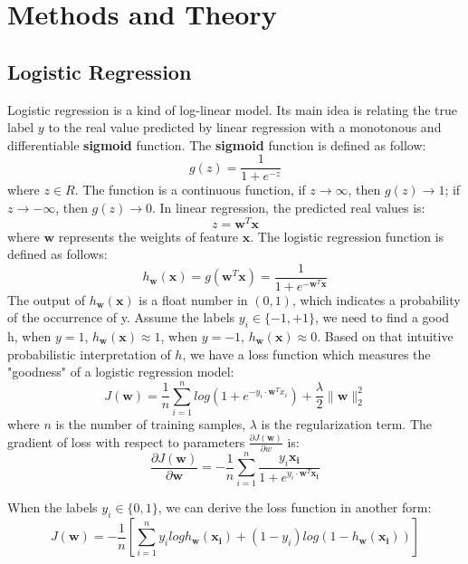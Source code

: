 \documentclass[journal, a4paper]{IEEEtran}
\begin{document}
\section{Methods and Theory}

\subsection{Logistic Regression}
Logistic regression is a kind of log-linear model. Its main idea is relating the true label $y$ to the real value predicted by linear regression with a monotonous and differentiable \textbf{sigmoid} function. The \textbf{sigmoid} function is defined as follow:
\begin{equation}
g(z) = \frac{1}{1+e^{-z}}
\end{equation}
where $z \in R$. The function is a continuous function, if $z \rightarrow \infty$, then $g(z) \rightarrow 1$; if $z \rightarrow -\infty$, then $g(z) \rightarrow 0$. In linear regression, the predicted real values is:
\begin{equation}
z = \bm{w}^{T}\bm{x}
\end{equation}
where $\bm{w}$ represents the weights of feature $\bm{x}$. The logistic regression function is defined as follows:
\begin{equation}
h_{\bm{w}}(\bm{x}) = g(\bm{w}^{T}\bm{x}) = \frac{1}{1+e^{-\bm{w}^{T}\bm{x}}}
\end{equation}
The output of $h_{\bm{w}}(\bm{x})$ is a float number in $(0,1)$, which indicates a probability of the occurrence of y. Assume the labels $y_i \in \{-1,+1\}$, we need to find a good h, when $y=1$, $h_{\bm{w}}(\bm{x}) \approx 1$, when $y=-1$, $h_{\bm{w}}(\bm{x}) \approx 0$. Based on that intuitive probabilistic interpretation of $h$, we have a loss function which measures the "goodness" of a logistic regression model:
\begin{equation}
J(\bm{w}) = \frac{1}{n}\sum_{i=1}^{n} log(1+e^{-y_i \cdot \bm{w}^Tx_i}) + \frac{\lambda}{2}\parallel \bm{w} \parallel_2^2
\end{equation}
where $n$ is the number of training samples, $\lambda$ is the regularization term. The gradient of loss with respect to parameters $\frac{\partial J(\bm{w})}{\partial w}$ is:
\begin{equation}
\frac{\partial J(\bm{w})}{\partial \bm{w}} = -\frac{1}{n}\sum_{i=1}^{n}\frac{y_i{\bm{x_i}}}{1+e^{{y_i} \cdot \bm{w}^T\bm{x_i}}}
\end{equation}


When the labels $y_i \in \{0,1\}$, we can derive the loss function in another form:
\begin{equation}
J(\bm{w}) = -\frac{1}{n}[\sum_{i=1}^{n} y_ilogh_{\bm{w}}(\bm{x_i})+(1-y_i)log(1-h_{\bm{w}}(\bm{x_i}))]
\end{equation}
\end{document}
